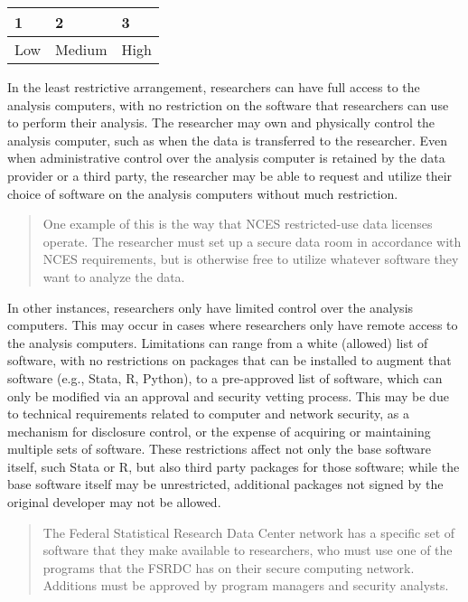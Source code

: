 \begin{longtable}[]{@{}lll@{}}
\toprule
1 & 2 & 3\tabularnewline
\midrule
\endhead
Low & Medium & High\tabularnewline
\bottomrule
\end{longtable}

In the least restrictive arrangement, researchers can have full access
to the analysis computers, with no restriction on the software that
researchers can use to perform their analysis. The researcher may own
and physically control the analysis computer, such as when the data is
transferred to the researcher. Even when administrative control over the
analysis computer is retained by the data provider or a third party, the
researcher may be able to request and utilize their choice of software
on the analysis computers without much restriction.

\begin{quote}
One example of this is the way that NCES restricted-use data licenses
operate. The researcher must set up a secure data room in accordance
with NCES requirements, but is otherwise free to utilize whatever
software they want to analyze the data.
\end{quote}

In other instances, researchers only have limited control over the
analysis computers. This may occur in cases where researchers only have
remote access to the analysis computers. Limitations can range from a
white (allowed) list of software, with no restrictions on packages that
can be installed to augment that software (e.g., Stata, R, Python), to a
pre-approved list of software, which can only be modified via an
approval and security vetting process. This may be due to technical
requirements related to computer and network security, as a mechanism
for disclosure control, or the expense of acquiring or maintaining
multiple sets of software. These restrictions affect not only the base
software itself, such Stata or R, but also third party packages for
those software; while the base software itself may be unrestricted,
additional packages not signed by the original developer may not be
allowed.

\begin{quote}
The Federal Statistical Research Data Center network has a specific set
of software that they make available to researchers, who must use one of
the programs that the FSRDC has on their secure computing network.
Additions must be approved by program managers and security analysts.
\end{quote}

